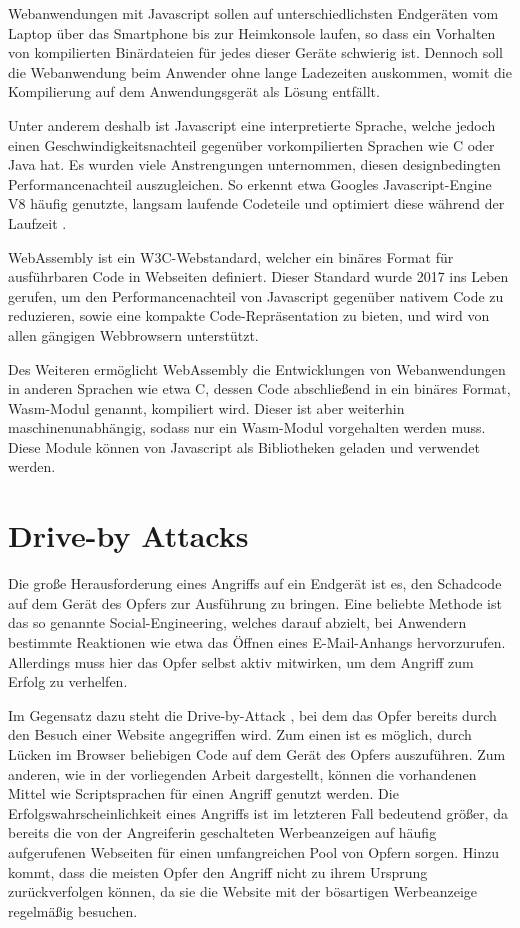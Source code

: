 Webanwendungen mit Javascript sollen auf unterschiedlichsten Endgeräten vom Laptop über das Smartphone bis zur Heimkonsole laufen, so dass ein Vorhalten von kompilierten Binärdateien für jedes dieser Geräte schwierig ist. 
Dennoch soll die Webanwendung beim Anwender ohne lange Ladezeiten auskommen, womit die Kompilierung auf dem Anwendungsgerät als Lösung entfällt.

Unter anderem deshalb ist Javascript eine interpretierte Sprache, welche jedoch einen Geschwindigkeitsnachteil gegenüber vorkompilierten Sprachen wie C oder Java hat.
Es wurden viele Anstrengungen unternommen, diesen designbedingten Performancenachteil auszugleichen. 
So erkennt etwa Googles Javascript-Engine V8 häufig genutzte, langsam laufende Codeteile und optimiert diese während der Laufzeit \cite{GoogleTurboFan}.

WebAssembly ist ein W3C-Webstandard, welcher ein binäres Format für ausführbaren Code in Webseiten definiert. 
Dieser Standard wurde 2017 ins Leben gerufen, um den Performancenachteil von Javascript gegenüber nativem Code zu reduzieren, sowie eine kompakte Code-Repräsentation zu bieten, und wird von allen gängigen Webbrowsern unterstützt.

Des Weiteren ermöglicht WebAssembly die Entwicklungen von Webanwendungen in anderen Sprachen wie etwa C, dessen Code abschließend in ein binäres Format, Wasm-Modul genannt, kompiliert wird.
Dieser ist aber weiterhin maschinenunabhängig, sodass nur ein Wasm-Modul vorgehalten werden muss.
Diese Module können von Javascript als Bibliotheken geladen und verwendet werden.

\section{Drive-by Attacks}

Die große Herausforderung eines Angriffs auf ein Endgerät ist es, den Schadcode auf dem Gerät des Opfers zur Ausführung zu bringen. Eine beliebte Methode ist das so genannte Social-Engineering, welches darauf abzielt, bei Anwendern bestimmte Reaktionen wie etwa das Öffnen eines E-Mail-Anhangs hervorzurufen. Allerdings muss hier das Opfer selbst aktiv mitwirken, um dem Angriff zum Erfolg zu verhelfen.

Im Gegensatz dazu steht die Drive-by-Attack \cite{DriveByAttacksGeneric}, bei dem das Opfer bereits durch den Besuch einer Website angegriffen wird. Zum einen ist es möglich, durch Lücken im Browser beliebigen Code auf dem Gerät des Opfers auszuführen. Zum anderen, wie in der vorliegenden Arbeit dargestellt, können die vorhandenen Mittel wie Scriptsprachen für einen Angriff genutzt werden.
Die Erfolgswahrscheinlichkeit eines Angriffs ist im letzteren Fall bedeutend größer, da bereits die von der Angreiferin geschalteten Werbeanzeigen auf häufig aufgerufenen Webseiten für einen umfangreichen Pool von Opfern sorgen.
Hinzu kommt, dass die meisten Opfer den Angriff nicht zu ihrem Ursprung zurückverfolgen können, da sie die Website mit der bösartigen Werbeanzeige regelmäßig besuchen.

